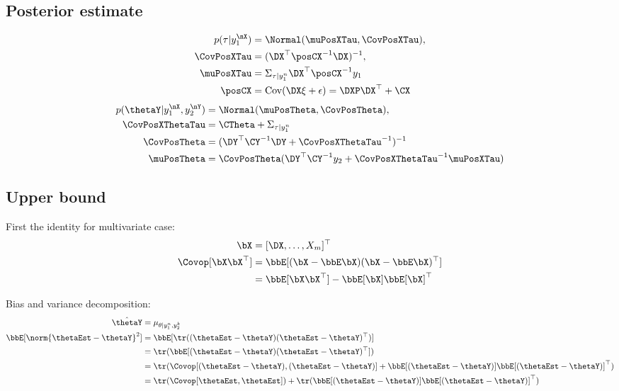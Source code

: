 \subsection{Posterior estimate}
\begin{align}
p(\tau \vert y_1^{\nX}) &= \Normal(\muPosXTau, \CovPosXTau),\\
\CovPosXTau &= (\DX^\top \posCX^{-1} \DX)^{-1}, \\
\muPosXTau &= \Sigma_{\tau \vert y_1^n} \DX^\top \posCX^{-1} y_1\\
\posCX &= \textrm{Cov}(\DX\xi + \epsilon) = \DXP\DX^\top + \CX
\end{align}
\begin{align}
p(\thetaY \vert y_1^{\nX}, y_2^{\nY}) &= \Normal(\muPosTheta, \CovPosTheta),\\
\CovPosXThetaTau &= \CTheta + \Sigma_{\tau \vert y_1^n} \\
\CovPosTheta &= (\DY^\top \CY^{-1} \DY + \CovPosXThetaTau^{-1})^{-1}\\
\muPosTheta &= \CovPosTheta (\DY^\top \CY^{-1} y_2 + \CovPosXThetaTau^{-1} \muPosXTau)
\end{align}

\subsection{Upper bound}
First the identity for multivariate case:
\begin{align}
\bX &= [\DX, \dots, X_m]^\top \\
\Covop[\bX \bX^\top] &= \bbE[(\bX - \bbE \bX) (\bX - \bbE \bX)^\top] \\
&= \bbE[\bX \bX^\top] - \bbE[\bX] \bbE[\bX]^\top
\end{align}

Bias and variance decomposition:
\begin{align}
\hat{\thetaY} &= \mu_{\theta \vert y_1^n, y_2^k} \\
\bbE[\norm{ \thetaEst - \thetaY }^2]  
&= \bbE[\tr( (\thetaEst - \thetaY) (\thetaEst - \thetaY)^\top)] \\
&= \tr( \bbE [(\thetaEst - \thetaY) (\thetaEst - \thetaY)^\top] ) \\
&= \tr( \Covop [(\thetaEst - \thetaY), (\thetaEst - \thetaY)] + 
\bbE[(\thetaEst - \thetaY)]\bbE[(\thetaEst - \thetaY)]^\top) \\
&= \tr( \Covop [\thetaEst, \thetaEst]) + 
\tr( \bbE[(\thetaEst - \thetaY)] \bbE[(\thetaEst - \thetaY)]^\top )
\end{align}

